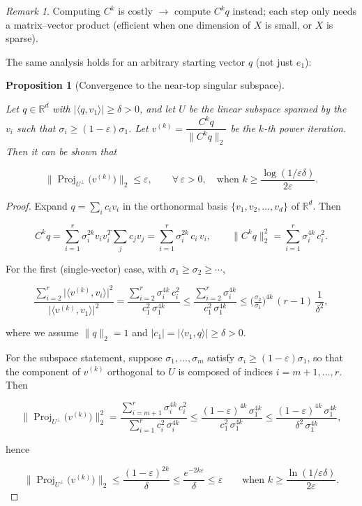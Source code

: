 \documentclass[
  letterpaper,
  DIV=11,
  numbers=noendperiod]{scrreprt}
\theoremstyle{definition}
\theoremstyle{plain}
\theoremstyle{plain}
\newtheorem{proposition}{Proposition}[chapter]
\theoremstyle{definition}
\theoremstyle{plain}
\theoremstyle{plain}
\theoremstyle{remark}
\newtheorem*{remark}{Remark}
\begin{document}
\begin{remark}
Computing \(C^k\) is costly \(\to\) compute \(C^k q\) instead; each step
only needs a matrix--vector product (efficient when one dimension of
\(X\) is small, or \(X\) is sparse).

\end{remark}

The same analysis holds for an arbitrary starting vector \(q\) (not just
\(e_1\)):

\begin{proposition}[Convergence to the near-top singular
subspace]\protect\hypertarget{prp-power-general}{}\label{prp-power-general}

Let \(q \in \mathbb{R}^d\) with
\(|\langle q, v_1\rangle| \ge \delta > 0\), and let \(U\) be the linear
subspace spanned by the \(v_i\) such that
\(\sigma_i \ge (1-\varepsilon)\sigma_1\). Let
\(v^{(k)} = \dfrac{C^k q}{\|C^k q\|_2}\) be the \(k\)-th power
iteration. Then it can be shown that

\[
\big\|\operatorname{Proj}_{U^{\perp}}\big(v^{(k)}\big)\big\|_2 \le \varepsilon,
\qquad \forall\, \varepsilon > 0, \quad \text{when } k \ge \frac{\log(1/\varepsilon\delta)}{2\varepsilon}.
\]

\end{proposition}

\begin{proof}
Expand \(q = \sum_{i} c_i v_i\) in the orthonormal basis
\(\{v_1, v_2, \dots, v_d\}\) of \(\mathbb{R}^d\). Then

\[
C^k q = \sum_{i=1}^{r} \sigma_i^{2k} v_i v_i^T \sum_{j} c_j v_j = \sum_{i=1}^{r} \sigma_i^{2k}\, c_i\, v_i,
\qquad
\|C^k q\|_2^2 = \sum_{i=1}^{r} \sigma_i^{4k}\, c_i^2 .
\]

For the first (single-vector) case, with
\(\sigma_1 \ge \sigma_2 \ge \cdots\),

\[
\frac{\sum_{i=2}^{r} \big|\langle v^{(k)}, v_i\rangle\big|^2}{\big|\langle v^{(k)}, v_1\rangle\big|^2}
= \frac{\sum_{i=2}^{r} \sigma_i^{4k}\, c_i^2}{c_1^2\, \sigma_1^{4k}}
\le \frac{\sum_{i=2}^{r} \sigma_i^{4k}}{c_1^2\, \sigma_1^{4k}}
\le \Big(\tfrac{\sigma_2}{\sigma_1}\Big)^{4k}\, (r-1)\, \frac{1}{\delta^2},
\]

where we assume \(\|q\|_2 = 1\) and
\(|c_1| = |\langle v_1, q\rangle| \ge \delta > 0\).

For the subspace statement, suppose \(\sigma_1, \dots, \sigma_m\)
satisfy \(\sigma_i \ge (1-\varepsilon)\sigma_1\), so that the component
of \(v^{(k)}\) orthogonal to \(U\) is composed of indices
\(i = m+1, \dots, r\). Then

\[
\big\|\operatorname{Proj}_{U^{\perp}}\big(v^{(k)}\big)\big\|_2^2
= \frac{\sum_{i=m+1}^{r} \sigma_i^{4k}\, c_i^2}{\sum_{i=1}^{r} c_i^2\, \sigma_i^{4k}}
\le \frac{(1-\varepsilon)^{4k}\, \sigma_1^{4k}}{c_1^2\, \sigma_1^{4k}}
\le \frac{(1-\varepsilon)^{4k}\, \sigma_1^{4k}}{\delta^2\, \sigma_1^{4k}},
\]

hence

\[
\big\|\operatorname{Proj}_{U^{\perp}}\big(v^{(k)}\big)\big\|_2
\le \frac{(1-\varepsilon)^{2k}}{\delta}
\le \frac{e^{-2k\varepsilon}}{\delta}
\le \varepsilon
\qquad \text{when } k \ge \frac{\ln(1/\varepsilon\delta)}{2\varepsilon}.
\]
\end{proof}
\end{document}

